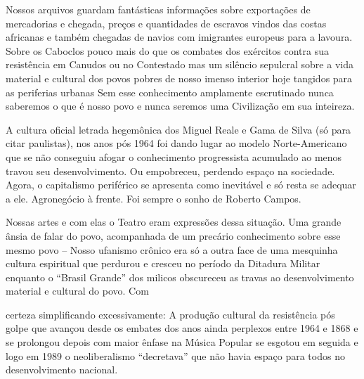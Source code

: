 Nossos arquivos guardam fantásticas informações sobre exportações de
mercadorias e chegada, preços e quantidades de escravos vindos das
costas africanas e também chegadas de navios com imigrantes europeus
para a lavoura. Sobre os Caboclos pouco mais do que os combates dos
exércitos contra sua resistência em Canudos ou no Contestado mas um
silêncio sepulcral sobre a vida material e cultural dos povos pobres de
nosso imenso interior hoje tangidos para as periferias urbanas Sem esse
conhecimento amplamente escrutinado nunca saberemos o que é nosso povo e
nunca seremos uma Civilização em sua inteireza.

A cultura oficial letrada hegemônica dos Miguel Reale e Gama de Silva
(só para citar paulistas), nos anos pós 1964 foi dando lugar ao modelo
Norte-Americano que se não conseguiu afogar o conhecimento progressista
acumulado ao menos travou seu desenvolvimento. Ou empobreceu, perdendo
espaço na sociedade. Agora, o capitalismo periférico se apresenta como
inevitável e só resta se adequar a ele. Agronegócio à frente. Foi sempre
o sonho de Roberto Campos.

Nossas artes e com elas o Teatro eram expressões dessa situação. Uma
grande ânsia de falar do povo, acompanhada de um precário conhecimento
sobre esse mesmo povo -- Nosso ufanismo crônico era só a outra face de
uma mesquinha cultura espiritual que perdurou e cresceu no período da
Ditadura Militar enquanto o “Brasil Grande” dos milicos obscureceu as
travas ao desenvolvimento material e cultural do povo. Com

\column

\noindent{}certeza
simplificando excessivamente: A produção cultural da resistência pós
golpe que avançou desde os embates dos anos ainda perplexos entre 1964 e
1868 e se prolongou depois com maior ênfase na Música Popular se esgotou
em seguida e logo em 1989 o neoliberalismo “decretava” que não havia
espaço para todos no desenvolvimento nacional.


